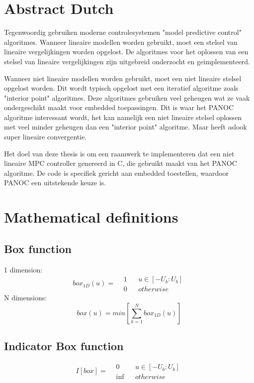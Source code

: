 \chapter{Abstract Dutch}
Tegenwoordig gebruiken moderne controlesystemen "model predictive control" algoritmes. Wanneer lineaire modellen worden gebruikt, moet een stelsel van lineaire vergelijkingen worden opgelost. De algoritmes voor het oplossen van een stelsel van lineaire vergelijkingen zijn uitgebreid onderzocht en geimplementeerd. 

Wanneer niet lineaire modellen worden gebruikt, moet een niet lineaire stelsel opgelost worden. Dit wordt typisch opgelost met een iteratief algoritme zoals "interior point" algoritmes. Deze algoritmes gebruiken veel geheugen wat ze vaak ondergeschikt maakt voor embedded toepassingen. Dit is waar het PANOC algoritme interessant wordt, het kan namelijk een niet lineaire stelsel oplossen met veel minder geheugen dan een "interior point" algoritme. Maar heeft aslook super lineaire convergentie.

Het doel van deze thesis is om een raamwerk te implementeren dat een niet lineaire MPC controller genereerd in C, die gebruikt maakt van het PANOC algoritme. De code is specifiek gericht aan embedded toestellen, waardoor PANOC een uitstekende keuze is. 


\chapter{Mathematical definitions}
	\section{Box function}
		1 dimension:
		\begin{equation}
			box_{1D}(u) =
			\begin{aligned}
			 & 1 && u \in [-U_b:U_b]\\
			 & 0 && otherwise
			\end{aligned}
			\label{eq:box function 1 dimension}
		\end{equation}
		N dimensions:
		\begin{equation}
		box(u) = min\left[ \sum_{k=1}^ N box_{1D}(u) \right]
		\label{eq:box function N dimensions}
		\end{equation}
	\section{Indicator Box function}
		\begin{equation}
			I[box]=
			\begin{aligned}
			& 0 && u \in [-U_b:U_b]\\
			& \inf && otherwise
			\end{aligned}
		\end{equation}
		
